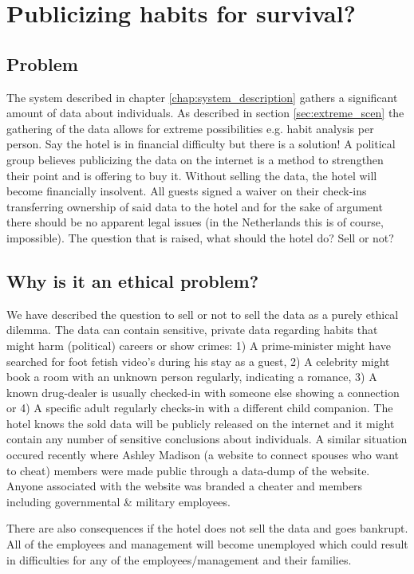 \chapter{Publicizing habits for survival?}

\section{Problem}
The system described in chapter \ref{chap:system_description} gathers a significant amount of data about individuals. As described in section \ref{sec:extreme_scen} the gathering of the data allows for extreme possibilities e.g. habit analysis per person. Say the hotel is in financial difficulty but there is a solution! A political group believes publicizing the data on the internet is a method to strengthen their point and is offering to buy it. Without selling the data, the hotel will become financially insolvent. All guests signed a waiver on their check-ins transferring ownership of said data to the hotel and for the sake of argument there should be no apparent legal issues (in the Netherlands this is of course, impossible). The question that is raised, what should the hotel do? Sell or not?


\section{Why is it an ethical problem?}
We have described the question to sell or not to sell the data as a purely ethical dilemma. The data can contain sensitive, private data regarding habits that might harm (political) careers or show crimes: 1) A prime-minister might have searched for foot fetish video's during his stay as a guest, 2) A celebrity might book a room with an unknown person regularly, indicating a romance, 3) A known drug-dealer is usually checked-in with someone else showing a connection or 4) A specific adult regularly checks-in with a different child companion. The hotel knows the sold data will be publicly released on the internet and it might contain any number of sensitive conclusions about individuals. A similar situation occured recently where Ashley Madison (a website to connect spouses who want to cheat) members were made public through a data-dump of the website. Anyone associated with the website was branded a cheater and members including governmental \& military employees\cite{ashley_madison}.

There are also consequences if the hotel does not sell the data and goes bankrupt. All of the employees and management will become unemployed which could result in difficulties for any of the employees/management and their families. 

